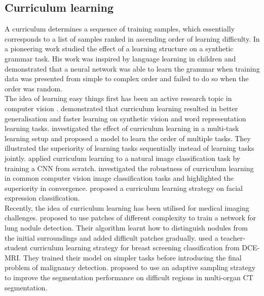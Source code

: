 \documentclass[preprint,12pt,authoryear]{elsarticle}
\begin{document}
\subsection{Curriculum learning}
\label{sec:curriculumintro}

A curriculum determines a sequence of training samples, which essentially corresponds to a list of samples ranked in ascending order of learning difficulty.
In a pioneering work \cite{Elman1993} studied the effect of a learning structure on a synthetic grammar task. His work was inspired  by  language  learning  in  children  and  demonstrated that a neural network was able  to  learn  the  grammar when training data was presented from simple to complex order and failed to do so when the order was random.\\

The idea of learning easy things first has been an active research topic in computer vision \citep{Lee2011}. \cite{Bengio2009} demonstrated that curriculum learning resulted in better generalisation and faster learning on synthetic vision and word representation  learning  tasks.  \cite{Pentina2015}  investigated the  effect  of  curriculum  learning  in a multi-task learning setup and proposed a model to learn the order of multiple tasks. They illustrated the superiority of learning tasks sequentially instead of learning tasks jointly. \cite{Avramova2015} applied curriculum learning to a natural image classification task by training a CNN from scratch. \cite{Weinshall2018} investigated the robustness of curriculum learning in common computer vision image classification tasks and highlighted the superiority in convergence. \cite{Gui2017} proposed a curriculum learning strategy on facial expression classification.\\


Recently, the idea of curriculum learning has been utilised for medical imaging challenges. \cite{Jesson2017} proposed to use patches of different complexity to train a network for lung nodule detection. Their algorithm learnt how to distinguish nodules from the initial surroundings and added difficult patches gradually.
\cite{Maicas2018} used a teacher-student curriculum learning strategy for breast screening classification from DCE-MRI. They trained their model on simpler tasks before introducing the final problem of malignancy detection.
\cite{Berger2018} proposed to use an adaptive sampling strategy to improve the segmentation performance on difficult regions in multi-organ CT segmentation.
\end{document}
